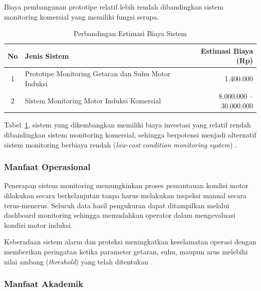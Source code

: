 \documentclass{elsinta}
\begin{document}
Biaya pembangunan prototipe relatif lebih rendah dibandingkan sistem monitoring komersial yang memiliki fungsi serupa.

\begin{table}[H]
\centering
\caption{Perbandingan Estimasi Biaya Sistem}
\label{tab:perbandingan_biaya}

\begin{tabular}{|c|p{8cm}|r|}
\hline
\textbf{No} &
\centering\textbf{Jenis Sistem} &
\textbf{Estimasi Biaya (Rp)}\\
\hline

1 &
Prototipe Monitoring Getaran dan Suhu Motor Induksi &
1.400.000\\
\hline

2 &
Sistem Monitoring Motor Induksi Komersial &
8.000.000 -- 30.000.000\\
\hline

\end{tabular}

\end{table}

Tabel~\ref{tab:perbandingan_biaya}, sistem yang dikembangkan memiliki biaya investasi yang relatif rendah dibandingkan sistem monitoring komersial, sehingga berpotensi menjadi alternatif sistem monitoring berbiaya rendah (\textit{low-cost condition monitoring system}) \cite{boardman2018}.

\subsubsection{Manfaat Operasional}

Penerapan sistem monitoring memungkinkan proses pemantauan kondisi motor dilakukan secara berkelanjutan tanpa harus melakukan inspeksi manual secara terus-menerus. Seluruh data hasil pengukuran dapat ditampilkan melalui dashboard monitoring sehingga memudahkan operator dalam mengevaluasi kondisi motor induksi.

Keberadaan sistem alarm dan proteksi meningkatkan keselamatan operasi dengan memberikan peringatan ketika parameter getaran, suhu, maupun arus melebihi nilai ambang (\textit{threshold}) yang telah ditentukan \cite{InternationalElectrotechnicalCommission2022, Jardine2006}.

\subsubsection{Manfaat Akademik}
\end{document}
